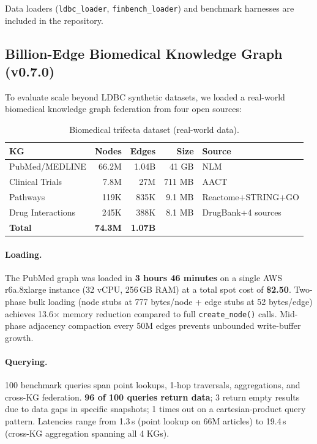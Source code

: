 \documentclass[11pt]{article}
\begin{document}
Data loaders (\texttt{ldbc\_loader}, \texttt{finbench\_loader}) and benchmark harnesses are included in the repository.

\subsection{Billion-Edge Biomedical Knowledge Graph (v0.7.0)}
\label{sec:billion-edge}

To evaluate scale beyond LDBC synthetic datasets, we loaded a real-world biomedical knowledge graph federation from four open sources:

\begin{table}[H]
  \centering
  \caption{Biomedical trifecta dataset (real-world data).}
  \label{tab:trifecta}
  \begin{tabular}{@{}lrrrl@{}}
    \toprule
    \textbf{KG} & \textbf{Nodes} & \textbf{Edges} & \textbf{Size} & \textbf{Source} \\
    \midrule
    PubMed/MEDLINE   & 66.2M  & 1.04B  & 41 GB & NLM \\
    Clinical Trials  & 7.8M   & 27M    & 711 MB & AACT \\
    Pathways         & 119K   & 835K   & 9.1 MB & Reactome+STRING+GO \\
    Drug Interactions& 245K   & 388K   & 8.1 MB & DrugBank+4 sources \\
    \midrule
    \textbf{Total}   & \textbf{74.3M} & \textbf{1.07B} & & \\
    \bottomrule
  \end{tabular}
\end{table}

\paragraph{Loading.} The PubMed graph was loaded in \textbf{3 hours 46 minutes} on a single AWS r6a.8xlarge instance (32 vCPU, 256\,GB RAM) at a total spot cost of \textbf{\$2.50}. Two-phase bulk loading (node stubs at 777 bytes/node + edge stubs at 52 bytes/edge) achieves 13.6$\times$ memory reduction compared to full \texttt{create\_node()} calls. Mid-phase adjacency compaction every 50M edges prevents unbounded write-buffer growth.

\paragraph{Querying.} 100 benchmark queries span point lookups, 1-hop traversals, aggregations, and cross-KG federation. \textbf{96 of 100 queries return data}; 3 return empty results due to data gaps in specific snapshots; 1 times out on a cartesian-product query pattern. Latencies range from 1.3\,s (point lookup on 66M articles) to 19.4\,s (cross-KG aggregation spanning all 4 KGs).
\end{document}
